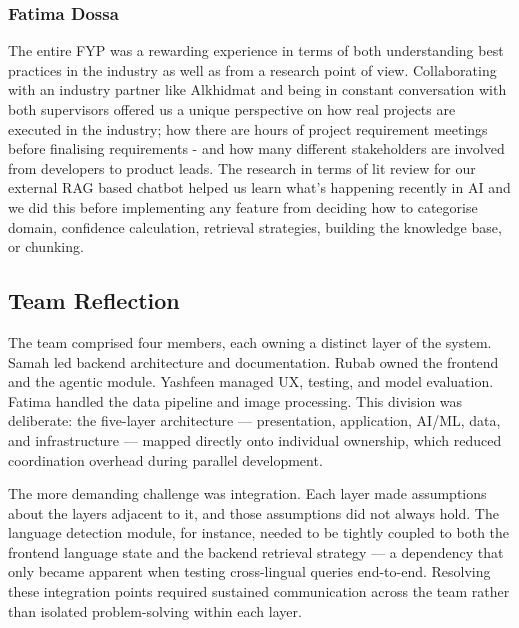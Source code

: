 \vspace{1em}
\subsubsection*{Fatima Dossa}

The entire FYP was a rewarding experience in terms of both understanding best practices in the 
industry as well as from a research point of view. Collaborating with an industry partner 
like Alkhidmat and being in constant conversation with both supervisors offered us a unique 
perspective on how real projects are executed in the industry; how there are hours of project 
requirement meetings before finalising requirements - and how many different stakeholders are 
involved from developers to product leads. The research in terms of lit review for our 
external RAG based chatbot helped us learn what’s happening recently in AI and we did this 
before implementing any feature from deciding how to categorise domain, confidence calculation, 
retrieval strategies, building the knowledge base, or chunking.

\subsection{Team Reflection}

The team comprised four members, each owning a distinct layer of the system. 
Samah led backend architecture and documentation. Rubab owned the frontend and 
the agentic module. Yashfeen managed UX, testing, and model evaluation. Fatima 
handled the data pipeline and image processing. This division was deliberate: 
the five-layer architecture — presentation, application, AI/ML, data, and 
infrastructure — mapped directly onto individual ownership, which reduced 
coordination overhead during parallel development.

The more demanding challenge was integration. Each layer made assumptions about 
the layers adjacent to it, and those assumptions did not always hold. The 
language detection module, for instance, needed to be tightly coupled to both 
the frontend language state and the backend retrieval strategy — a dependency 
that only became apparent when testing cross-lingual queries end-to-end. 
Resolving these integration points required sustained communication across the 
team rather than isolated problem-solving within each layer.

